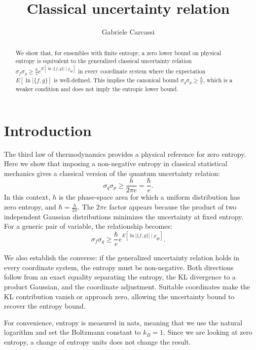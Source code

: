 \documentclass{techbrief}
\title{Classical uncertainty relation}
\author{Gabriele Carcassi}
\begin{document}
\maketitle

\begin{abstract}
	We show that, for ensembles with finite entropy, a zero lower bound on physical entropy is equivalent to the generalized classical uncertainty relation $\sigma_f\sigma_g\geq\frac{\hbar}{e}e^{E[\ln|\{f,g\}|\mid\rho_{qp}]}$ in every coordinate system where the expectation $E[\ln|\{f,g\}]$ is well-defined. This implies the canonical bound $\sigma_q\sigma_p\geq\frac{\hbar}{e}$, which is a weaker condition and does not imply the entropic lower bound.
\end{abstract}

\section{Introduction}

The third law of thermodynamics provides a physical reference for zero entropy. Here we show that imposing a non-negative entropy in classical statistical mechanics gives a classical version of the quantum uncertainty relation:
\begin{equation}
	\sigma_q\sigma_p\geq\frac{h}{2\pi e}=\frac{\hbar}{e}.
\end{equation}
In this context, $h$ is the phase-space area for which a uniform distribution has zero entropy, and $\hbar=\frac{h}{2\pi}$. The $2\pi e$ factor appears because the product of two independent Gaussian distributions minimizes the uncertainty at fixed entropy. For a generic pair of variable, the relationship becomes:
\begin{equation*}
	\sigma_f\sigma_g\geq\frac{\hbar}{e}e^{E[\ln|\{f,g\}|\mid\rho_{qp}]}.
\end{equation*}

We also establish the converse: if the generalized uncertainty relation holds in every coordinate system, the entropy must be non-negative. Both directions follow from an exact equality separating the entropy, the KL divergence to a product Gaussian, and the coordinate adjustment. Suitable coordinates make the KL contribution vanish or approach zero, allowing the uncertainty bound to recover the entropy bound.

For convenience, entropy is measured in nats, meaning that we use the natural logarithm and set the Boltzmann constant to $k_B=1$. Since we are looking at zero entropy, a change of entropy units does not change the result.
\end{document}
